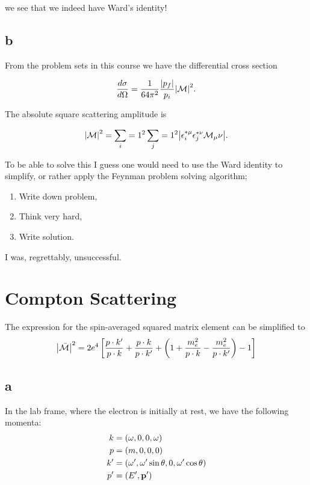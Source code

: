 \documentclass[11pt, a4paper]{amsart}
\begin{document}
we see that we indeed have Ward's identity!

\subsection*{b}

From the problem sets in this course we have the differential cross section

\begin{equation}
\frac{d\sigma}{d\Omega} = \frac{1}{64\pi^2} \frac{\abs{p_f}}{p_i} \abs{\mathcal{M}}^2.
\end{equation}

The absolute square scattering amplitude is

\begin{equation}
\abs{\mathcal{M}}^2 = \sum_i=1^2 \sum_j=1^2 \abs{\epsilon_i^{*\mu}\epsilon_j^{*\nu}\mathcal{M}_\mu\nu}.
\end{equation}

To be able to solve this I guess one would need to use the Ward identity to simplify, or rather apply the Feynman problem solving algorithm;
\begin{enumerate}
\item Write down problem,
\item Think very hard,
\item Write solution.
\end{enumerate}
I was, regrettably, unsuccessful.

\section{Compton Scattering}
The expression for the spin-averaged squared matrix element can be simplified to
\begin{equation}
\abs{\bar{\mathcal{M}}}^2 = 2e^4 \left[\frac{p\cdot k'}{p\cdot k} + \frac{p \cdot k}{p \cdot k'} + \left(1 + \frac{m_e^2}{p\cdot k} - \frac{m_e^2}{p\cdot k'} \right) - 1 \right]
\end{equation}

\subsection*{a}

In the lab frame, where the electron is initially at rest, we have the following momenta:
\begin{align}
k  &= (\omega, 0, 0, \omega) \\
p  &= (m, 0, 0, 0) \\
k' &= (\omega', \omega' \sin \theta, 0, \omega' \cos \theta) \\
p' &= (E', \vb{p}')
\end{align}
\end{document}
